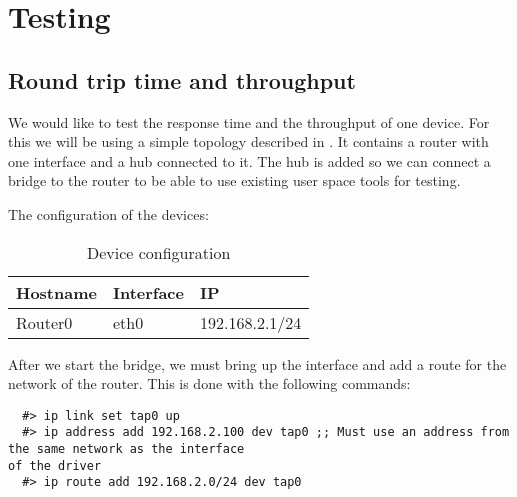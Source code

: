 \chapter{Testing}
\label{chapter:testing}

\section{Round trip time and throughput}
\label{sec:response-time}


We would like to test the response time and the throughput of one device. For this we will be using
a simple topology described in . It contains a router with one interface and
a hub connected to it. The hub is added so we can connect a bridge to the router to be able to use
existing user space tools for testing.


The configuration of the devices:

\begin{center}
  \begin{table}[htb]
  \begin{center}
  \begin{tabular}{| l | l | l |}
    \hline
      \textbf{Hostname} & \textbf{Interface} & \textbf{IP}  \\ \hline
      Router0 & eth0 & 192.168.2.1/24 \\ 
    \hline
  \end{tabular}
  \end{center}
  \caption{Device configuration}
  \label{table:rtt-conf}
  \end{table}
\end{center}

After we start the bridge, we must bring up the interface and add a route for the network of the
router. This is done with the following commands:

\lstset{language=zsh,caption=Configuring a TAP interface,label=lst:conf-tap}
\begin{lstlisting}
  #> ip link set tap0 up
  #> ip address add 192.168.2.100 dev tap0 ;; Must use an address from the same network as the interface
of the driver
  #> ip route add 192.168.2.0/24 dev tap0
\end{lstlisting}

